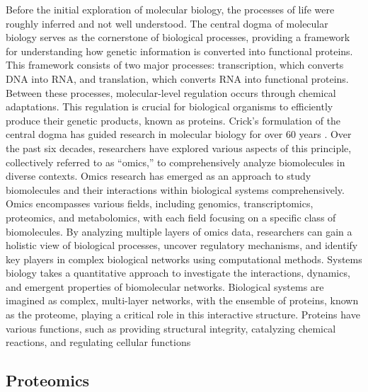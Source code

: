\documentclass[
  11pt,
]{article}
\begin{document}
Before the initial exploration of molecular biology, the processes of life were roughly inferred and not well understood. The central dogma of molecular biology serves as the cornerstone of biological processes, providing a framework for understanding how genetic information is converted into functional proteins. This framework consists of two major processes: transcription, which converts DNA into RNA, and translation, which converts RNA into functional proteins. Between these processes, molecular-level regulation occurs through chemical adaptations. This regulation is crucial for biological organisms to efficiently produce their genetic products, known as proteins. Crick's formulation of the central dogma has guided research in molecular biology for over 60 years \citep{Cobb2017}.
Over the past six decades, researchers have explored various aspects of this principle, collectively referred to as ``omics,'' to comprehensively analyze biomolecules in diverse contexts. Omics research has emerged as an approach to study biomolecules and their interactions within biological systems comprehensively. Omics encompasses various fields, including genomics, transcriptomics, proteomics, and metabolomics, with each field focusing on a specific class of biomolecules. By analyzing multiple layers of omics data, researchers can gain a holistic view of biological processes, uncover regulatory mechanisms, and identify key players in complex biological networks using computational methods.
Systems biology takes a quantitative approach to investigate the interactions, dynamics, and emergent properties of biomolecular networks. Biological systems are imagined as complex, multi-layer networks, with the ensemble of proteins, known as the proteome, playing a critical role in this interactive structure. Proteins have various functions, such as providing structural integrity, catalyzing chemical reactions, and regulating cellular functions \citep{Karahalil2016}

\hypertarget{proteomics}{%
\subsection{Proteomics}\label{proteomics}}
\end{document}
